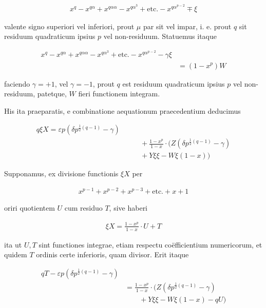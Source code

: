 \[
\begin{aligned}
x^q-x^{q\alpha}+x^{q\alpha\alpha}-x^{q\alpha^3}+\text{etc.}-x^{q\alpha^{p-2}}\mp\xi
\end{aligned}
\]

valente signo superiori vel inferiori, prout $\mu$ par sit vel impar, i. e. prout $q$ sit residuum quadraticum ipsius $p$ vel non-residuum. Statuemus itaque

\[
\begin{aligned}
x^q-x^{q\alpha}+x^{q\alpha\alpha}- x^{q\alpha^3}+\text{etc.}-x^{q\alpha^{p-2}}-\gamma\xi\\&=(1-x^p)W
\end{aligned}
\]

faciendo $\gamma=+1$, vel $\gamma=-1$, prout $q$ est residuum quadraticum ipsius $p$ vel non-residuum, patetque, $W$ fieri functionem integram.


His ita praeparatis, e combinatione aequationum praecedentium deducimus

\[
\begin{aligned}
q\xi X=\varepsilon p(\delta p^{\frac12(q-1)}-\gamma)\\&\qquad+\frac{1-x^p}{1-x}\cdot(Z(\delta p^{\frac12(q-1)}-\gamma)\\&\qquad+Y\xi\xi-W\xi(1-x))
\end{aligned}
\]

Supponamus, ex divisione functionis $\xi X$ per

\[
\begin{aligned}
x^{p-1}+x^{p-2}+x^{p-3}+\text{etc.}+x+1
\end{aligned}
\]

oriri quotientem $U$ cum residuo $T$, sive haberi

\[
\begin{aligned}
\xi X=\frac{1-x^p}{1-x}\cdot U+T
\end{aligned}
\]

ita ut $U,T$ sint functiones integrae, etiam respectu coëfficientium numericorum, et quidem $T$ ordinis certe inferioris, quam divisor. Erit itaque

\[
\begin{aligned}
qT-\varepsilon p(\delta p^{\frac12(q-1)}-\gamma)\\&=\frac{1-x^p}{1-x}\cdot(Z(\delta p^{\frac12(q-1)}-\gamma)\\&\qquad+Y\xi\xi-W\xi(1-x)-qU)
\end{aligned}
\]

